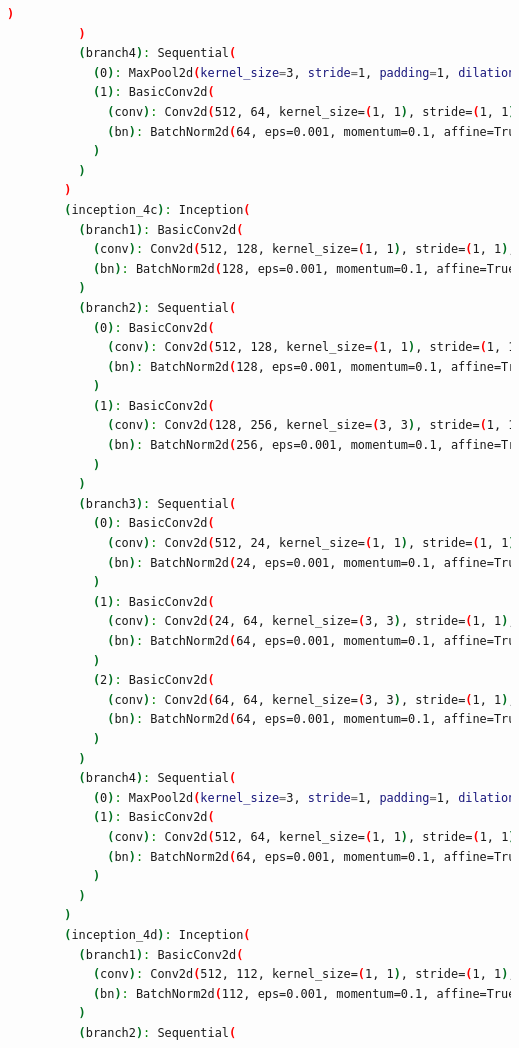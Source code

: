 \documentclass[a4paper, 12pt]{article}
\begin{document}
\begin{lstlisting}[language=sh]
            )
          )
          (branch4): Sequential(
            (0): MaxPool2d(kernel_size=3, stride=1, padding=1, dilation=1, ceil_mode=False)
            (1): BasicConv2d(
              (conv): Conv2d(512, 64, kernel_size=(1, 1), stride=(1, 1), bias=False)
              (bn): BatchNorm2d(64, eps=0.001, momentum=0.1, affine=True, track_running_stats=True)
            )
          )
        )
        (inception_4c): Inception(
          (branch1): BasicConv2d(
            (conv): Conv2d(512, 128, kernel_size=(1, 1), stride=(1, 1), bias=False)
            (bn): BatchNorm2d(128, eps=0.001, momentum=0.1, affine=True, track_running_stats=True)
          )
          (branch2): Sequential(
            (0): BasicConv2d(
              (conv): Conv2d(512, 128, kernel_size=(1, 1), stride=(1, 1), bias=False)
              (bn): BatchNorm2d(128, eps=0.001, momentum=0.1, affine=True, track_running_stats=True)
            )
            (1): BasicConv2d(
              (conv): Conv2d(128, 256, kernel_size=(3, 3), stride=(1, 1), padding=(1, 1), bias=False)
              (bn): BatchNorm2d(256, eps=0.001, momentum=0.1, affine=True, track_running_stats=True)
            )
          )
          (branch3): Sequential(
            (0): BasicConv2d(
              (conv): Conv2d(512, 24, kernel_size=(1, 1), stride=(1, 1), bias=False)
              (bn): BatchNorm2d(24, eps=0.001, momentum=0.1, affine=True, track_running_stats=True)
            )
            (1): BasicConv2d(
              (conv): Conv2d(24, 64, kernel_size=(3, 3), stride=(1, 1), padding=(1, 1), bias=False)
              (bn): BatchNorm2d(64, eps=0.001, momentum=0.1, affine=True, track_running_stats=True)
            )
            (2): BasicConv2d(
              (conv): Conv2d(64, 64, kernel_size=(3, 3), stride=(1, 1), padding=(1, 1), bias=False)
              (bn): BatchNorm2d(64, eps=0.001, momentum=0.1, affine=True, track_running_stats=True)
            )
          )
          (branch4): Sequential(
            (0): MaxPool2d(kernel_size=3, stride=1, padding=1, dilation=1, ceil_mode=False)
            (1): BasicConv2d(
              (conv): Conv2d(512, 64, kernel_size=(1, 1), stride=(1, 1), bias=False)
              (bn): BatchNorm2d(64, eps=0.001, momentum=0.1, affine=True, track_running_stats=True)
            )
          )
        )
        (inception_4d): Inception(
          (branch1): BasicConv2d(
            (conv): Conv2d(512, 112, kernel_size=(1, 1), stride=(1, 1), bias=False)
            (bn): BatchNorm2d(112, eps=0.001, momentum=0.1, affine=True, track_running_stats=True)
          )
          (branch2): Sequential(

\end{lstlisting}
\end{document}
